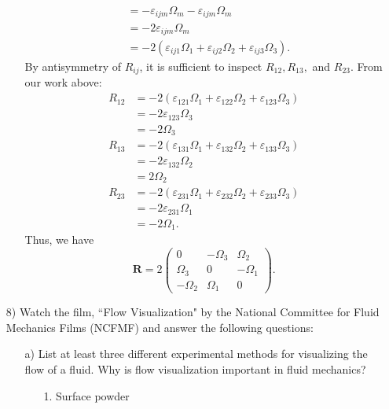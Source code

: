 \documentclass{article}
\begin{document}
\begin{itemize}
\begin{itemize}
\begin{align*}
            &= -\varepsilon_{ijm}\Omega_m - \varepsilon_{ijm}\Omega_m\\
            &= -2\varepsilon_{ijm}\Omega_m\\
            &= -2(\varepsilon_{ij1}\Omega_1 + \varepsilon_{ij2}\Omega_2 + \varepsilon_{ij3}\Omega_3).
        \end{align*}
        By antisymmetry of $R_{ij}$, it is sufficient to inspect $R_{12},R_{13},$ and $R_{23}$. From our work above:
        \begin{align*}
            R_{12} &= -2(\varepsilon_{121}\Omega_1 + \varepsilon_{122}\Omega_2 + \varepsilon_{123}\Omega_3)\\
            &= -2\varepsilon_{123}\Omega_3\\
            &= -2\Omega_3\\
            R_{13} &= -2(\varepsilon_{131}\Omega_1 + \varepsilon_{132}\Omega_2 + \varepsilon_{133}\Omega_3)\\
            &= -2\varepsilon_{132}\Omega_2\\
            &= 2\Omega_2\\
            R_{23} &= -2(\varepsilon_{231}\Omega_1 + \varepsilon_{232}\Omega_2 + \varepsilon_{233}\Omega_3)\\
            &= -2\varepsilon_{231}\Omega_1\\
            &= -2\Omega_1.
        \end{align*}
        Thus, we have
        \[\mathbf{R} = 2\begin{pmatrix}
            0 & -\Omega_3 & \Omega_2\\
            \Omega_3 & 0 & -\Omega_1\\
            -\Omega_2 & \Omega_1 & 0
        \end{pmatrix}.\]
    \end{itemize}

    \pagebreak
    \item[8)] Watch the film, ``Flow Visualization" by the National Committee for Fluid Mechanics Films (NCFMF) and answer the following questions:
    \begin{itemize}
        \item[a)] List at least three different experimental methods for visualizing the flow of a fluid. Why is flow visualization important in fluid mechanics?
        
        \begin{itemize}
            \item[1.] Surface powder


\end{itemize}
\end{itemize}
\end{itemize}
\end{document}
